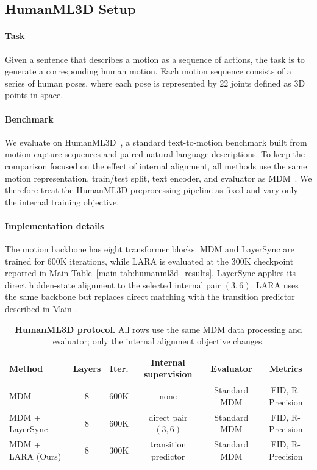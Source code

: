 \subsection{HumanML3D Setup}
\label{app:humanml3d_details}

\paragraph{Task}
Given a sentence that describes a motion as a sequence of actions, the task is to generate a corresponding human motion. Each motion sequence consists of a series of human poses, where each pose is represented by 22 joints defined as 3D points in space.

\paragraph{Benchmark}
We evaluate on HumanML3D~\citep{guo2022generating}, a standard text-to-motion benchmark built from motion-capture sequences and paired natural-language descriptions. To keep the comparison focused on the effect of internal alignment, all methods use the same motion representation, train/test split, text encoder, and evaluator as MDM~\citep{tevet2022mdm}. We therefore treat the HumanML3D preprocessing pipeline as fixed and vary only the internal training objective.

\paragraph{Implementation details}
The motion backbone has eight transformer blocks. MDM and LayerSync are trained for 600K iterations, while LARA is evaluated at the 300K checkpoint reported in Main Table~\ref{main-tab:humanml3d_results}. LayerSync applies its direct hidden-state alignment to the selected internal pair $(3,6)$. LARA uses the same backbone but replaces direct matching with the transition predictor described in Main .

\begin{table}[!t]
    \centering
    \caption{\textbf{HumanML3D protocol.} All rows use the same MDM data processing and evaluator; only the internal alignment objective changes.}
    \label{tab:appendix_humanml3d_setup}
    \small
    \setlength{\tabcolsep}{4pt}
    \begin{tabular}{lccccc}
        \toprule
        Method & Layers & Iter. & Internal supervision & Evaluator & Metrics \\
        \midrule
        MDM & 8 & 600K & none & Standard MDM & FID, R-Precision \\
        MDM + LayerSync & 8 & 600K & direct pair $(3,6)$ & Standard MDM & FID, R-Precision \\
        MDM + LARA (Ours) & 8 & 300K & transition predictor & Standard MDM & FID, R-Precision \\
        \bottomrule
    \end{tabular}
\end{table}


